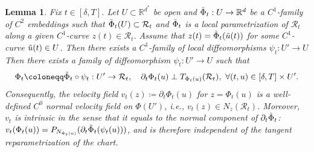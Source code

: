\documentclass[11pt]{article}
\newcommand{\mb}{\mathbb}
\newcommand{\mc}{\mathcal}
\newtheorem{lemma}{Lemma}[section]
\begin{document}
\begin{lemma}\label{lem:normal gauge existence} Fix $t\in [\delta,T]$. Let $U\subset\mb{R}^{d^*}$ be open and $\Tilde{\Phi}_t:U\to\mb{R}^d$ be a $C^1$-family of $C^2$ embeddings such that $\Tilde{\Phi}_t(U)\subset \mc{R}_t$ and $\Tilde{\Phi}_t$ is a local parametrization of $\mc{R}_t$ along a given $C^1$-curve $z(t)\in \mc{R}_t$. Assume that $z(t)=\Tilde{\Phi}_t(\Tilde{u}(t))$ for some $C^1$-curve $\Tilde{u}(t)\in U$. Then there exists a $C^1$-family of local diffeomorphisms $\psi_t: U'\to U$ Then there exists a family of diffeomorphism $\psi_t:U'\to U$ such that
\begin{align*}
    \Phi_t \coloneqq \Tilde{\Phi}_t \circ \psi_t : U'\to \mc{R}_t,\quad \partial_t \Phi_t(u) \perp T_{\Phi_t(u)}(\mc{R}_t),\ \forall (t,u)\in [\delta,T]\times U'.
\end{align*}
Consequently, the velocity field $v_t(z)\coloneqq \partial_t \Phi_t(u)$ for $z= \Phi_t(u)$ is a well-defined $C^0$ normal velocity field on $\Phi(U')$, i.e., $v_t(z)\in N_z(\mc{R}_t)$. Moreover, $v_t$ is intrinsic in the sense that it equals to the normal component of $\partial_t\Tilde{\Phi}_t$: $v_t(\Phi_t(u))=P_{N_{\Phi_t(u)}}(\partial_t\Tilde{\Phi}_t(\psi_t(u)))$, and is therefore independent of the tangent reparametrization of the chart. 
\end{lemma}
\end{document}
